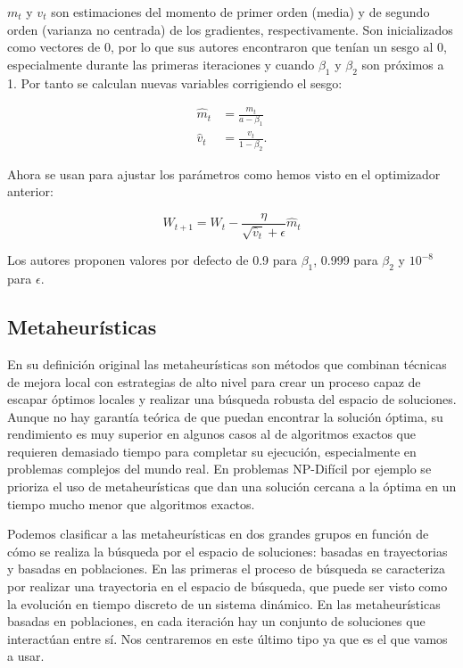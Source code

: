 $m_t$ y $v_t$ son estimaciones del momento de primer orden (media) y de segundo orden (varianza no centrada) de los gradientes, respectivamente. Son inicializados como vectores de 0, por lo que sus autores encontraron que tenían un sesgo al 0, especialmente durante las primeras iteraciones y cuando $\beta_1$ y $\beta_2$ son próximos a 1. Por tanto se calculan nuevas variables corrigiendo el sesgo:

\begin{align*}
	\hat{m}_t&=\frac{m_t}{a-\beta_1}\\
	\hat{v}_t&=\frac{v_t}{1-\beta_2}.
\end{align*}

Ahora se usan para ajustar los parámetros como hemos visto en el optimizador anterior:

$$W_{t+1} = W_t - \frac{\eta}{\sqrt{\hat{v}_t} + \epsilon} \hat{m}_t$$

Los autores proponen valores por defecto de 0.9 para $\beta_1$, 0.999 para $\beta_2$ y $10^{-8}$ para $\epsilon$.



\subsection{Metaheurísticas}
\label{sec:mh}

En su definición original las metaheurísticas son métodos que combinan técnicas de mejora local con estrategias de alto nivel para crear un proceso capaz de escapar óptimos locales y realizar una búsqueda robusta del espacio de soluciones. Aunque no hay garantía teórica de que puedan encontrar la solución óptima, su rendimiento es muy superior en algunos casos al de algoritmos exactos que requieren demasiado tiempo para completar su ejecución, especialmente en problemas complejos del mundo real. En problemas NP-Difícil por ejemplo se prioriza el uso de metaheurísticas que dan una solución cercana a la óptima en un tiempo mucho menor que algoritmos exactos.

Podemos clasificar a las metaheurísticas en dos grandes grupos en función de cómo se realiza la búsqueda por el espacio de soluciones: basadas en trayectorias y basadas en poblaciones. En las primeras el proceso de búsqueda se caracteriza por realizar una trayectoria en el espacio de búsqueda, que puede ser visto como la evolución en tiempo discreto de un sistema dinámico. En las metaheurísticas basadas en poblaciones, en cada iteración hay un conjunto de soluciones que interactúan entre sí. Nos centraremos en este último tipo ya que es el que vamos a usar.

